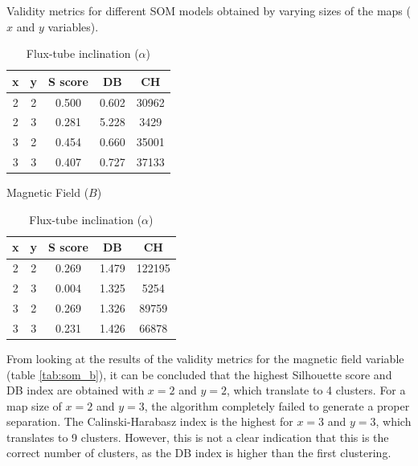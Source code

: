 \begin{table}[h]
    \caption[Validity Scores for SOM]{Validity metrics for different SOM models obtained by varying sizes of the maps ($x$ and $y$ variables).}\label{tab:validity_som}
    \begin{subtable}[h]{0.48\textwidth}
        \centering
        \begin{tabular}{@{}ccccc@{}}
            \toprule
            \textbf{x} & \textbf{y} & \textbf{S score} & \textbf{DB} & \textbf{CH} \\ \midrule
            2          & 2          & 0.500            & 0.602       & 30962   \\
            2          & 3          & 0.281            & 5.228       & 3429    \\
            3          & 2          & 0.454            & 0.660       & 35001   \\
            3          & 3          & 0.407            & 0.727       & 37133   \\ \bottomrule
            \end{tabular}
        \caption{Magnetic Field ($B$)}
        \label{tab:som_b}
    \end{subtable}
    \hfill
    \begin{subtable}[h]{0.48\textwidth}
        \centering
        \begin{tabular}{@{}ccccc@{}}
            \toprule
            \textbf{x} & \textbf{y} & \textbf{S score} & \textbf{DB} & \textbf{CH} \\ \midrule
            2          & 2          & 0.269            & 1.479       & 122195 \\
            2          & 3          & 0.004            & 1.325       & 5254    \\
            3          & 2          & 0.269            & 1.326       & 89759   \\
            3          & 3          & 0.231            & 1.426       & 66878   \\ \bottomrule
            \end{tabular}
        \caption{Flux-tube inclination ($\alpha$)}
        \label{tab:som_alpha}
    \end{subtable}
\end{table}

From looking at the results of the validity metrics for the magnetic field variable (table \ref{tab:som_b}), it can be concluded that the highest Silhouette score and DB index are obtained with $x=2$ and $y=2$, which translate to 4 clusters. For a map size of $x=2$ and $y=3$, the algorithm completely failed to generate a proper separation. The Calinski-Harabasz index is the highest for $x=3$ and $y=3$, which translates to 9 clusters. However, this is not a clear indication that this is the correct number of clusters, as the DB index is higher than the first clustering.

